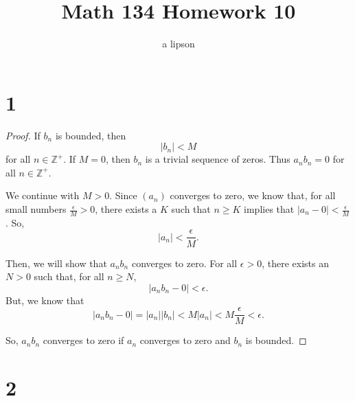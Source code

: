 \documentclass{article}
\title{Math 134 Homework 10}
\author{a lipson}
\begin{document}
\maketitle

\section*{1}

\begin{proof}
If $b_n$ is bounded, then \[|b_n|<M\] for all $n\in\mathbb{Z}^+$.
If $M=0$, then $b_n$ is a trivial sequence of zeros.
Thus $a_n b_n=0$ for all $n\in\mathbb{Z}^+$.

We continue with $M>0$. Since $(a_n)$ converges to zero, we know that, for all small numbers $\frac{\epsilon}{M}>0$, there exists a $K$ such that $n\geq K$ implies that $|a_n-0|<\frac{\epsilon}{M}$.
So, \[|a_n|<\frac{\epsilon}{M}.\]

Then, we will show that $a_n b_n$ converges to zero.
For all $\epsilon>0$, there exists an $N>0$ such that, for all $n\geq N$, \[|a_n b_n - 0|<\epsilon.\]
But, we know that \[|a_n b_n - 0|=|a_n||b_n|<M|a_n|<M\frac{\epsilon}{M}<\epsilon.\]

So, $a_n b_n$ converges to zero if $a_n$ converges to zero and $b_n$ is bounded.
\end{proof}

\section*{2}
\end{document}

